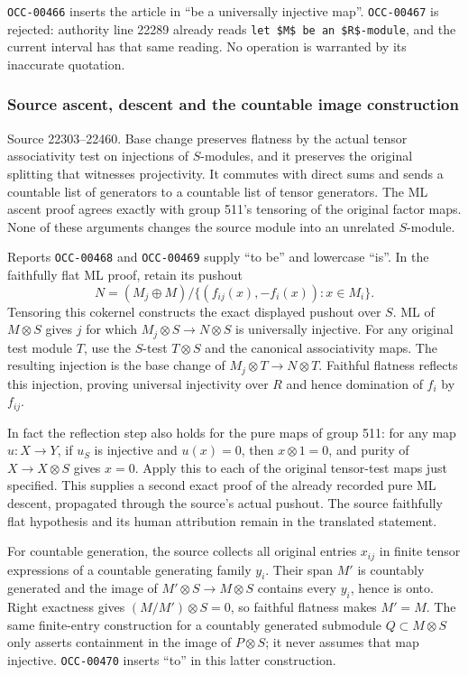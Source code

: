 \texttt{OCC-00466} inserts the article in ``be a universally injective map''. \texttt{OCC-00467} is rejected: authority line 22289 already reads \texttt{let\ \$M\$\ be\ an\ \$R\$-module}, and the current interval has that same reading. No operation is warranted by its inaccurate quotation.

\subsubsection{Source ascent, descent and the countable image construction}\label{algebra-proof-013-source-ascent-descent-and-the-countable-image-construction}

Source 22303--22460. Base change preserves flatness by the actual tensor associativity test on injections of \(S\)-modules, and it preserves the original splitting that witnesses projectivity. It commutes with direct sums and sends a countable list of generators to a countable list of tensor generators. The ML ascent proof agrees exactly with group 511's tensoring of the original factor maps. None of these arguments changes the source module into an unrelated \(S\)-module.

Reports \texttt{OCC-00468} and \texttt{OCC-00469} supply ``to be'' and lowercase ``is''. In the faithfully flat ML proof, retain its pushout \[
N=(M_j\oplus M)/\{(f_{ij}(x),-f_i(x)):x\in M_i\}.
\] Tensoring this cokernel constructs the exact displayed pushout over \(S\). ML of \(M\otimes S\) gives \(j\) for which \(M_j\otimes S\to N\otimes S\) is universally injective. For any original test module \(T\), use the \(S\)-test \(T\otimes S\) and the canonical associativity maps. The resulting injection is the base change of \(M_j\otimes T\to N\otimes T\). Faithful flatness reflects this injection, proving universal injectivity over \(R\) and hence domination of \(f_i\) by \(f_{ij}\).

In fact the reflection step also holds for the pure maps of group 511: for any map \(u:X\to Y\), if \(u_S\) is injective and \(u(x)=0\), then \(x\otimes1=0\), and purity of \(X\to X\otimes S\) gives \(x=0\). Apply this to each of the original tensor-test maps just specified. This supplies a second exact proof of the already recorded pure ML descent, propagated through the source's actual pushout. The source faithfully flat hypothesis and its human attribution remain in the translated statement.

For countable generation, the source collects all original entries \(x_{ij}\) in finite tensor expressions of a countable generating family \(y_i\). Their span \(M'\) is countably generated and the image of \(M'\otimes S\to M\otimes S\) contains every \(y_i\), hence is onto. Right exactness gives \((M/M')\otimes S=0\), so faithful flatness makes \(M'=M\). The same finite-entry construction for a countably generated submodule \(Q\subset M\otimes S\) only asserts containment in the image of \(P\otimes S\); it never assumes that map injective. \texttt{OCC-00470} inserts ``to'' in this latter construction.

